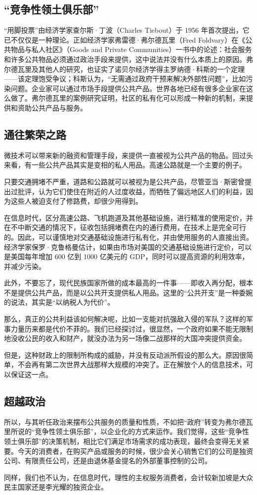 \subsection{“竞争性领土俱乐部”}
“用脚投票”由经济学家查尔斯·丁波（Charles Tiebout）于 1956 年首次提出，它已不仅仅是一种理论。正如经济学家弗雷德·弗尔德瓦里（Fred Foldvary）在《公共物品与私人社区》（Goods and Private Communities）一书中的论述：社会服务和许多公共物品必须通过政治手段来提供，这中说法并没有什么本质上的原因。弗尔德瓦里及其他人的研究，也证实了诺贝尔经济学得主罗纳德·科斯的一个定理——该定理饱受争议；科斯认为，“无需通过政府干预来解决外部性问题”，比如污染问题。企业家可以通过市场手段提供公共产品。世界各地已经有很多企业家在这么做了。弗尔德瓦里的案例研究证明，社区的私有化可以形成一种新的机制，来提供和资助公共产品与服务。

\subsection{通往繁荣之路}
微技术可以带来新的融资和管理手段，来提供一直被视为公共产品的物品。回过头来看，有一些公共产品其实是变相的私人用品。高速公路就是一个主要的例子。

只要交通拥堵不严重，道路和公路就可以被视为是公共产品，尽管亚当·斯密曾提出过批评，认为它们使住在附近的人过度收益，而牺牲了偏远地区人们的利益，因为这些人被迫支付了修路费，却很少用得到。

在信息时代，区分高速公路、飞机跑道及其他基础设施，进行精准的使用定价，并在不中断交通的情况下，征收包括拥堵费在内的通行费用，在技术上是完全可行的。因此，可以谨慎地对交通基础设施进行私有化，并由使用服务的人直接出资。经济学家保罗·克鲁格曼估计，如果由市场对美国的交通基础设施进行定价，可以是美国每年增加 600 亿到 1000 亿美元的 GDP，同时可以提高资源的利用效率，并减少污染。

此外，不要忘了，现代民族国家所做的成本最高的一件事——即收入再分配，根本不是提供公共产品，而是以公共开支提供私人用品。这里的“公共开支”是一种委婉的说法，其实是“以纳税人为代价”。

那么，真正的公共利益该如何解决呢，比如一支能对抗强敌入侵的军队？这样的军事力量历来都是代价不菲的。我们已经探讨过，很显然，一个政府如果不能无限制地没收公民的收入和财产，就没办法为另一场像二战那样的大国冲突提供资金。

但是，这种财政上的限制所构成的威胁，并没有反动派所假设的那么大。原因很简单，不会再有第二次世界大战那样大规模的冲突了。正在解放个人的信息技术，可以保证这一点。

\subsection{超越政治}
所以，与其听任政治来摆布公共服务的质量和性质，不如把“政府”转变为弗尔德瓦里所说的“竞争性领土俱乐部”，以企业化的方式来运作。我们觉得，这些“竞争性领土俱乐部”的决策机制，相比它们满足市场需求的成功表现，最终会变得无关紧要。今天的消费者，在购买产品或服务的时候，很少会关心销售它们的公司是独资公司、有限责任公司，还是由退休基金提名的外部董事控制的公司。

同样，我们也不认为，在信息时代，理性的主权服务消费者，会计较新加坡是大众民主国家还是李光耀的独资企业。